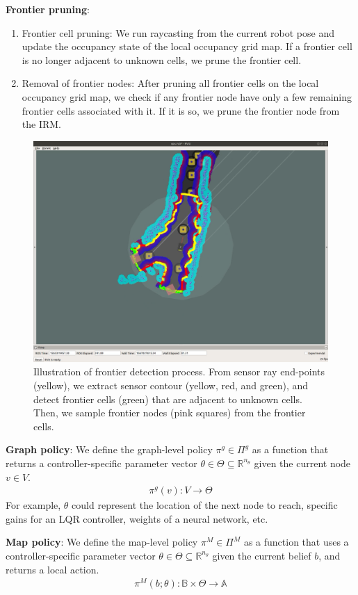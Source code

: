 \documentclass[letterpaper, 10 pt, conference]{ieeeconf}  %
\newcommand{\ph}[1]{{\textbf{#1}:}} %
\newcommand{\note}[1]{{\color{cyan} NOTE: #1 }}
\begin{document}
\ph{Frontier pruning}
\begin{enumerate}
\item Frontier cell pruning: 
We run raycasting from the current robot pose and update the occupancy state of the local occupancy grid map.
If a frontier cell is no longer adjacent to unknown cells, we prune the frontier cell.
\item Removal of frontier nodes: 
After pruning all frontier cells on the local occupancy grid map, we check if any frontier node have only a few remaining frontier cells associated with it.
If it is so, we prune the frontier node from the IRM. 
\end{enumerate}

\begin{figure}[ht!]
  \centering
  \includegraphics[trim={7cm 9cm 10cm 5cm},clip,width=.48\textwidth]{figures/frontier_detection.png}
  \caption{Illustration of frontier detection process.
    From sensor ray end-points (yellow), we extract sensor contour (yellow, red, and green), and detect frontier cells (green) that are adjacent to unknown cells. Then, we sample frontier nodes (pink squares) from the frontier cells.}
  \label{fig:frontiering}
\end{figure}


\ph{Graph policy}
We define the graph-level policy $\pi^g \in \Pi^g$ as a function that returns a controller-specific parameter vector $\theta\in\Theta\subseteq\mathbb{R}^{n_\theta}$ given the current node $v \in V$.
\begin{align}
    \pi^g(v): V\rightarrow \Theta
\end{align}
For example, $\theta$ could represent the location of the next node to reach, specific gains for an LQR controller, weights of a neural network, etc.

\ph{Map policy}
We define the map-level policy $\pi^M \in \Pi^M$ as a function that uses a controller-specific parameter vector $\theta\in\Theta\subseteq\mathbb{R}^{n_\theta}$ given the current belief $b$, and returns a local action.
\begin{align}
    \pi^M(b;\theta): \mathbb{B}\times\Theta\rightarrow \mathbb{A}
\end{align}
\end{document}
